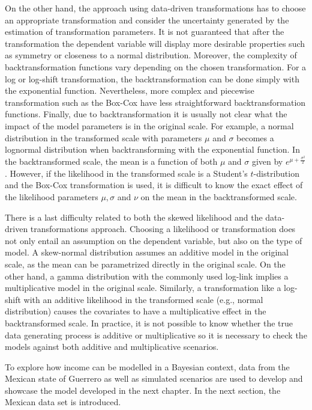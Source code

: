On the other hand, the approach using data-driven transformations has to choose an appropriate transformation and consider the uncertainty generated by the estimation of transformation parameters.
It is not guaranteed that after the transformation the dependent variable will display more desirable properties such as symmetry or closeness to a normal distribution.
Moreover, the complexity of backtransformation functions vary depending on the chosen transformation.
For a log or log-shift transformation, the backtransformation can be done simply with the exponential function.
Nevertheless, more complex and piecewise transformation such as the Box-Cox have less straightforward backtransformation functions.
Finally, due to backtransformation it is usually not clear what the impact of the model parameters is in the original scale.
For example, a normal distribution in the transformed scale with parameters $\mu$ and $\sigma$ becomes a lognormal distribution when backtransforming with the exponential function.
In the backtransformed scale, the mean is a function of both $\mu$ and $\sigma$ given by $e^{\mu + \frac{\sigma^2}{2}}$.
However, if the likelihood in the transformed scale is a Student's $t$-distribution and the Box-Cox transformation is used, it is difficult to know the exact effect of the likelihood parameters $\mu, \sigma$ and $\nu$ on the mean in the backtransformed scale.

There is a last difficulty related to both the skewed likelihood and the data-driven transformations approach.
Choosing a likelihood or transformation does not only entail an assumption on the dependent variable, but also on the type of model.
A skew-normal distribution assumes an additive model in the original scale, as the mean can be parametrized directly in the original scale. On the other hand, a gamma distribution with the commonly used log-link implies a multiplicative model in the original scale.
Similarly, a transformation like a log-shift with an additive likelihood in the transformed scale (e.g., normal distribution) causes the covariates to have a multiplicative effect in the backtransformed scale.
In practice, it is not possible to know whether the true data generating process is additive or multiplicative so it is necessary to check the models against both additive and multiplicative scenarios.

To explore how income can be modelled in a Bayesian context, data from the Mexican state of Guerrero as well as simulated scenarios are used to develop and showcase the model developed in the next chapter.
In the next section, the Mexican data set is introduced.

